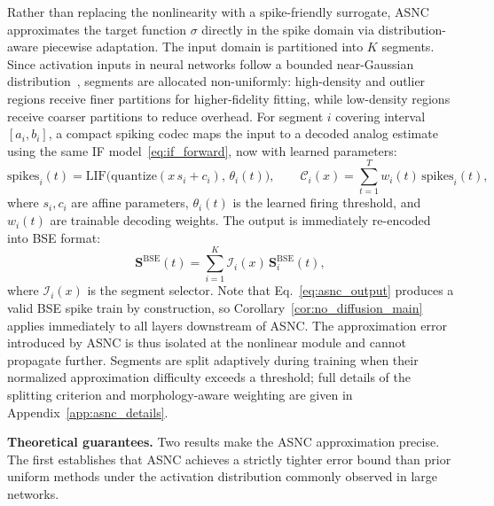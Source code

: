 \documentclass{article}
\theoremstyle{plain}
\theoremstyle{definition}
\theoremstyle{remark}
\begin{document}
Rather than replacing the nonlinearity with a spike-friendly surrogate, ASNC
approximates the target function $\sigma$ directly in the spike domain via
distribution-aware piecewise adaptation. The input domain is partitioned into $K$
segments. Since activation inputs in neural networks follow a bounded near-Gaussian
distribution~\citep{he2024understanding,lin2024duquant}, segments are allocated
non-uniformly: high-density and outlier regions receive finer partitions for
higher-fidelity fitting, while low-density regions receive coarser partitions to
reduce overhead. For segment $i$ covering interval $[a_i, b_i]$, a compact spiking
codec maps the input to a decoded analog estimate using the same IF
model~\eqref{eq:if_forward}, now with learned parameters:
\begin{equation}
\label{eq:asnc_codec}
\mathrm{spikes}_i(t)
  = \mathrm{LIF}\!\bigl(\mathrm{quantize}(x\,s_i + c_i),\,\theta_i(t)\bigr),
\qquad
\mathcal{C}_i(x) = \sum_{t=1}^{T} w_i(t)\,\mathrm{spikes}_i(t),
\end{equation}
where $s_i, c_i$ are affine parameters, $\theta_i(t)$ is the learned firing
threshold, and $w_i(t)$ are trainable decoding weights. The output is immediately
re-encoded into BSE format:
\begin{equation}
\label{eq:asnc_output}
\mathbf{S}^{\mathrm{BSE}}(t)
  = \sum_{i=1}^{K} \mathcal{I}_i(x)\,\mathbf{S}^{\mathrm{BSE}}_i(t),
\end{equation}
where $\mathcal{I}_i(x)$ is the segment selector. Note that
Eq.~\eqref{eq:asnc_output} produces a valid BSE spike train by construction, so
Corollary~\ref{cor:no_diffusion_main} applies immediately to all layers downstream of
ASNC. The approximation error introduced by ASNC is thus isolated at the nonlinear
module and cannot propagate further. Segments are split adaptively during training
when their normalized approximation difficulty exceeds a threshold; full details of
the splitting criterion and morphology-aware weighting are given in
Appendix~\ref{app:asnc_details}.

\noindent\textbf{Theoretical guarantees.}
Two results make the ASNC approximation precise. The first establishes that ASNC
achieves a strictly tighter error bound than prior uniform methods under the
activation distribution commonly observed in large networks.
 
\end{document}

